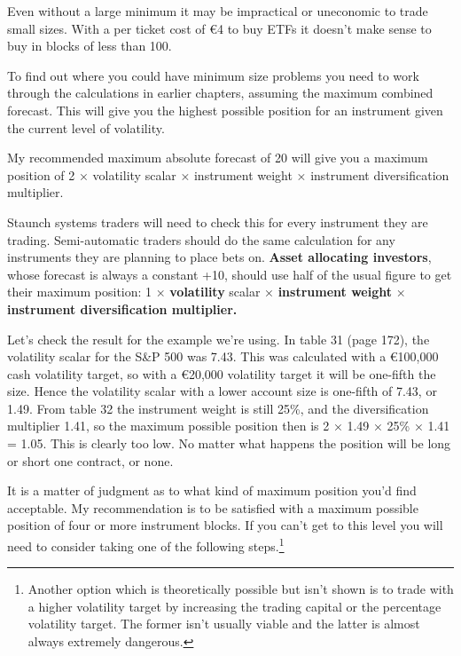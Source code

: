 Even without a large minimum it may be impractical or uneconomic to trade small sizes. With a per ticket cost of €4 to buy ETFs it doesn't make sense to buy in blocks of less than 100.

To find out where you could have minimum size problems you need to work through the calculations in earlier chapters, assuming the maximum combined forecast. This will give you the highest possible position for an instrument given the current level of volatility.

My recommended maximum absolute forecast of 20 will give you a maximum position of 2 × volatility scalar × instrument weight × instrument diversification multiplier.

Staunch systems traders will need to check this for every instrument they are trading. Semi-automatic traders should do the same calculation for any instruments they are planning to place bets on. \textbf{Asset allocating investors}, whose forecast is always a constant +10, should use half of the usual figure to get their maximum position: 1 × \textbf{volatility} scalar × \textbf{instrument weight} × \textbf{instrument diversification multiplier.}

Let's check the result for the example we're using. In table 31 (page 172), the volatility scalar for the S\&P 500 was 7.43. This was calculated with a €100,000 cash volatility target, so with a €20,000 volatility target it will be one-fifth the size. Hence the volatility scalar with a lower account size is one-fifth of 7.43, or 1.49. From table 32 the instrument weight is still 25\%, and the diversification multiplier 1.41, so the maximum possible position then is 2 × 1.49 × 25\% × 1.41 = 1.05. This is clearly too low. No matter what happens the position will be long or short one contract, or none.

It is a matter of judgment as to what kind of maximum position you'd find acceptable. My recommendation is to be satisfied with a maximum possible position of four or more instrument blocks. If you can't get to this level you will need to consider taking one of the following steps.\footnote{Another option which is theoretically possible but isn't shown is to trade with a higher volatility target by increasing the trading capital or the percentage volatility target. The former isn't usually viable and the latter is almost always extremely dangerous.}

